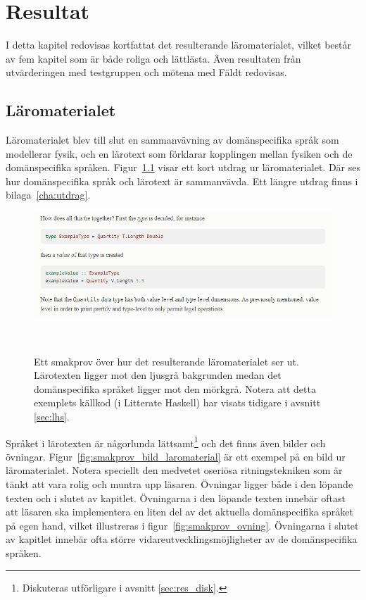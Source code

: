 \chapter{Resultat}

I detta kapitel redovisas kortfattat det resulterande läromaterialet, vilket består av fem kapitel som är både roliga och lättlästa. Även
resultaten från utvärderingen med testgruppen och mötena med Fäldt redovisas.

\section{Läromaterialet}\label{sec:res_laromaterial}

Läromaterialet blev till slut en sammanvävning av domänspecifika språk som
modellerar fysik, och en lärotext som förklarar kopplingen mellan fysiken och de
domänspecifika språken. Figur~\ref{fig:smakprov_laromaterial} visar ett kort
utdrag ur läromaterialet. Där ses hur domänspecifika språk och lärotext
är sammanvävda. Ett längre utdrag finns i bilaga~\ref{cha:utdrag}.

\begin{figure}[tph]
  \includegraphics[width=\linewidth]{figure/smakprov_laromaterial.png}
  \caption{Ett smakprov över hur det resulterande läromaterialet ser ut. Lärotexten ligger mot den ljusgrå bakgrunden medan det domänspecifika språket ligger mot den mörkgrå. Notera att detta exemplets källkod (i Litterate Haskell) har visats tidigare i avsnitt \ref{sec:lhs}.}~\label{fig:smakprov_laromaterial} 
\end{figure}

Språket i lärotexten är någorlunda lättsamt\footnote{Diskuteras utförligare i avsnitt \ref{sec:res_disk}.} och det finns även bilder och övningar.
Figur~\ref{fig:smakprov_bild_laromaterial} är ett exempel på en bild ur
läromaterialet. Notera speciellt den medvetet oseriösa ritningstekniken som är
tänkt att vara rolig och muntra upp läsaren. Övningar ligger både i den löpande
texten och i slutet av kapitlet. Övningarna i den löpande texten innebär oftast
att läsaren ska implementera en liten del av det aktuella domänspecifika språket
på egen hand, vilket illustreras i figur~\ref{fig:smakprov_ovning}. Övningarna i slutet av kapitlet innebär ofta större vidareutvecklingsmöjligheter av de domänspecifika språken.

